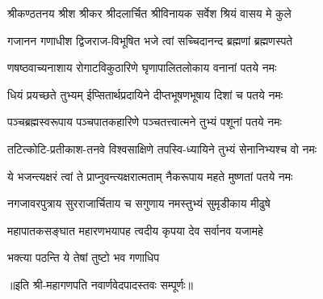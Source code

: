 
\twolineshloka
{श्रीकण्ठतनय श्रीश श्रीकर श्रीदलार्चित}
{श्रीविनायक सर्वेश श्रियं वासय मे कुले}

\twolineshloka
{गजानन गणाधीश द्विजराज-विभूषित}
{भजे त्वां सच्चिदानन्द ब्रह्मणां ब्रह्मणस्पते}

\twolineshloka
{णषष्ठवाच्यनाशाय रोगाटविकुठारिणे}
{घृणापालितलोकाय वनानां पतये नमः}

\twolineshloka
{धियं प्रयच्छते तुभ्यम् ईप्सितार्थप्रदायिने}
{दीप्तभूषणभूषाय दिशां च पतये नमः}

\twolineshloka
{पञ्चब्रह्मस्वरूपाय पञ्चपातकहारिणे}
{पञ्चतत्त्वात्मने तुभ्यं पशूनां पतये नमः}

\twolineshloka
{तटित्कोटि-प्रतीकाश-तनवे विश्वसाक्षिणे}
{तपस्वि-ध्यायिने तुभ्यं सेनानिभ्यश्च वो नमः}

\twolineshloka
{ये भजन्त्यक्षरं त्वां ते प्राप्नुवन्त्यक्षरात्मताम्}
{नैकरूपाय महते मुष्णतां पतये नमः}

\twolineshloka
{नगजावरपुत्राय सुरराजार्चिताय च}
{सगुणाय नमस्तुभ्यं सुमृडीकाय मीढुषे}

\twolineshloka
{महापातकसङ्घात महारणभयापह}
{त्वदीय कृपया देव सर्वानव यजामहे}


{भक्त्या पठन्ति ये तेषां तुष्टो भव गणाधिप}

॥इति श्री-महागणपति नवार्णवेदपादस्तवः सम्पूर्णः॥
